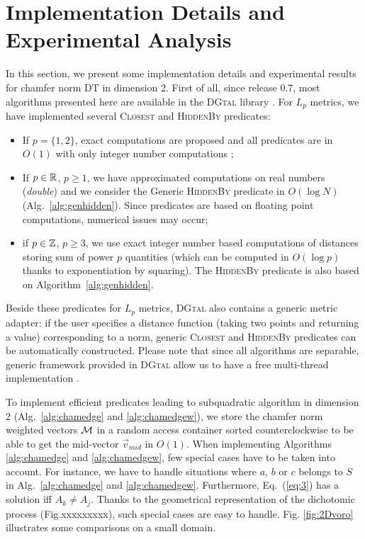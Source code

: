 \documentclass{llncs}
\begin{document}
\section{Implementation Details and Experimental Analysis}
\label{sec:exper-analys}

In this section, we present some implementation details and
experimental results for chamfer norm DT in dimension 2.  First of
all, since release 0.7, most algorithms presented here are available
in the \textsc{DGtal} library \cite{dgtal}. For $L_p$ metrics, we have
implemented several \textsc{Closest} and \textsc{HiddenBy} predicates:
\begin{itemize}
\item If $p=\{1,2\}$, exact computations are proposed and all
  predicates are in $O(1)$ with only integer number computations
  \cite{Hirata1996,Maurer2003,roerdnik};
\item If $p\in {\mathbb{R}}$,  $p\geq 1$, we have approximated computations
  on real numbers (\emph{double}) and we consider the Generic
  \textsc{HiddenBy} predicate in $O(\log N)$
  (Alg.~\ref{alg:genhidden}). Since predicates are based on floating
  point computations, numerical issues may occur;
\item if $p\in {\mathbb{Z}}$, $p\geq 3$, we use exact integer number based
  computations of distances  storing sum of power $p$ quantities (which can be
  computed in $O(\log{p})$ thanks to exponentiation by squaring). The
  \textsc{HiddenBy} predicate is also based on Algorithm~\ref{alg:genhidden}.
\end{itemize}

Beside these predicates for $L_p$ metrics, \textsc{DGtal} also
contains a generic metric adapter: if the user specifies a distance
function (taking two points and returning a value) corresponding to a
norm, generic \textsc{Closest} and \textsc{HiddenBy} predicates can be
automatically constructed. Please note that since all algorithms are
separable, generic framework provided in \textsc{DGtal} allow us to
have a free multi-thread implementation \cite{dcoeurjo_ChapDTWADGMM}.

To implement efficient predicates leading to subquadratic algorithm in
dimension 2 (Alg.~\ref{alg:chamedge} and \ref{alg:chamedgew}), we
store the chamfer norm weighted vectors $\mathcal{M}$ in a random access
container sorted counterclockwise to be able to get the mid-vector
$\vec{v}_{mid}$ in $O(1)$. When implementing Algorithms
\ref{alg:chamedge} and \ref{alg:chamedgew}, few special cases have to
be taken into account. For instance, we have to handle situations
where $a$, $b$ or $c$ belongs to $S$ in Alg.~\ref{alg:chamedge} and
\ref{alg:chamedgew}. Furthermore, Eq.~(\ref{eq:3}) has a solution iff
$A_k\neq A_j$. Thanks to the geometrical representation of the
dichotomic process (Fig.xxxxxxxxx), such special cases are easy to
handle. Fig. \ref{fig:2Dvoro} illustrates some comparisons on a small
domain.
\end{document}
